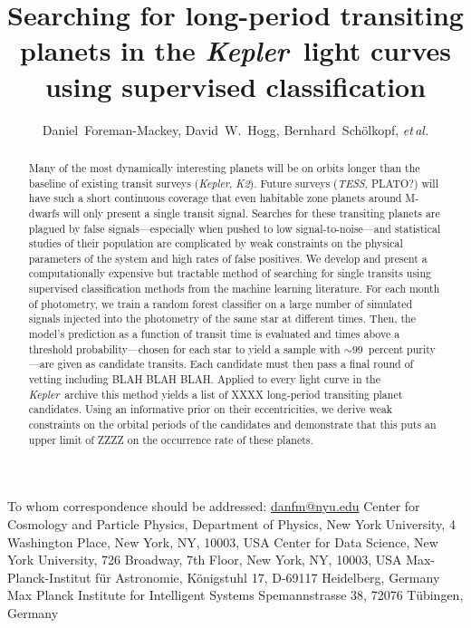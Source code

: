 \documentclass[12pt,preprint]{aastex}
\newcommand{\project}[1]{\textsl{#1}}
\newcommand{\kepler}{\project{Kepler}}
\newcommand{\KT}{\project{K2}}
\newcommand{\tess}{\project{TESS}}
\newcommand{\foreign}[1]{\emph{#1}}
\newcommand{\etal}{\foreign{et\,al.}}
\begin{document}
\title{%
    Searching for long-period transiting planets in the \kepler\ light curves
    using supervised classification
}

\newcommand{\nyu}{2}
\newcommand{\cds}{3}
\newcommand{\mpia}{4}
\newcommand{\mpis}{5}
\author{%
    Daniel~Foreman-Mackey\altaffilmark{1,\nyu,\cds},
    David~W.~Hogg\altaffilmark{\nyu,\mpia,\cds},
    Bernhard~Sch\"olkopf\altaffilmark{\mpis},
    \etal
}
         {To whom correspondence should be addressed:
                          \url{danfm@nyu.edu}}
\altaffiltext{\nyu}      {Center for Cosmology and Particle Physics,
                          Department of Physics, New York University,
                          4 Washington Place, New York, NY, 10003, USA}
\altaffiltext{\cds}      {Center for Data Science, New York University,
                          726 Broadway, 7th Floor, New York, NY, 10003, USA}
\altaffiltext{\mpia}     {Max-Planck-Institut f\"ur Astronomie,
                          K\"onigstuhl 17, D-69117 Heidelberg, Germany}
\altaffiltext{\mpis}     {Max Planck Institute for Intelligent Systems
                          Spemannstrasse 38, 72076 T\"ubingen, Germany}

\begin{abstract}

Many of the most dynamically interesting planets will be on orbits longer
than the baseline of existing transit surveys (\kepler, \KT).
Future surveys (\tess, PLATO?) will have such a short continuous coverage that
even habitable zone planets around M-dwarfs will only present a single transit
signal.
Searches for these transiting planets are plagued by false
signals---especially when pushed to low signal-to-noise---and statistical
studies of their population are complicated by weak constraints on the
physical parameters of the system and high rates of false positives.
We develop and present a computationally expensive but tractable method of
searching for single transits using supervised classification methods from
the machine learning literature.
For each month of photometry, we train a random forest classifier on a large
number of simulated signals injected into the photometry of the same star at
different times.
Then, the model's prediction as a function of transit time is evaluated and
times above a threshold probability---chosen for each star to yield a sample
with $\sim99$~percent purity---are given as candidate transits.
Each candidate must then pass a final round of vetting including BLAH BLAH
BLAH.
Applied to every light curve in the \kepler\ archive this method yields a
list of XXXX long-period transiting planet candidates.
Using an informative prior on their eccentricities, we derive weak constraints
on the orbital periods of the candidates and demonstrate that this puts an
upper limit of ZZZZ on the occurrence rate of these planets.

\end{abstract}
\end{document}
